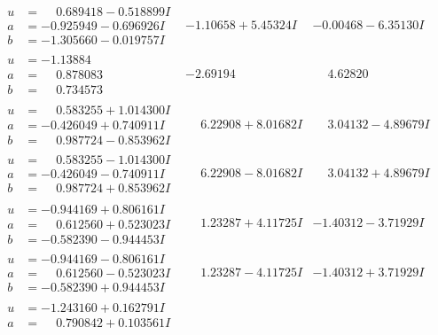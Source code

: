 \documentclass[1p]{elsarticle_modified}
\theoremstyle{definition}
\begin{document}
$$\begin{array}{c|c|c}
\begin{aligned}
u &= \phantom{-}0.689418 - 0.518899 I \\
a &= -0.925949 - 0.696926 I \\
b &= -1.305660 - 0.019757 I\end{aligned}
 & -1.10658 + 5.45324 I & -0.00468 - 6.35130 I \\ \hline\begin{aligned}
u &= -1.13884\phantom{ +0.000000I} \\
a &= \phantom{-}0.878083\phantom{ +0.000000I} \\
b &= \phantom{-}0.734573\phantom{ +0.000000I}\end{aligned}
 & -2.69194\phantom{ +0.000000I} & \phantom{-}4.62820\phantom{ +0.000000I} \\ \hline\begin{aligned}
u &= \phantom{-}0.583255 + 1.014300 I \\
a &= -0.426049 + 0.740911 I \\
b &= \phantom{-}0.987724 - 0.853962 I\end{aligned}
 & \phantom{-}6.22908 + 8.01682 I & \phantom{-}3.04132 - 4.89679 I \\ \hline\begin{aligned}
u &= \phantom{-}0.583255 - 1.014300 I \\
a &= -0.426049 - 0.740911 I \\
b &= \phantom{-}0.987724 + 0.853962 I\end{aligned}
 & \phantom{-}6.22908 - 8.01682 I & \phantom{-}3.04132 + 4.89679 I \\ \hline\begin{aligned}
u &= -0.944169 + 0.806161 I \\
a &= \phantom{-}0.612560 + 0.523023 I \\
b &= -0.582390 - 0.944453 I\end{aligned}
 & \phantom{-}1.23287 + 4.11725 I & -1.40312 - 3.71929 I \\ \hline\begin{aligned}
u &= -0.944169 - 0.806161 I \\
a &= \phantom{-}0.612560 - 0.523023 I \\
b &= -0.582390 + 0.944453 I\end{aligned}
 & \phantom{-}1.23287 - 4.11725 I & -1.40312 + 3.71929 I \\ \hline\begin{aligned}
u &= -1.243160 + 0.162791 I \\
a &= \phantom{-}0.790842 + 0.103561 I \\

\end{aligned}
\end{array}$$
\end{document}
